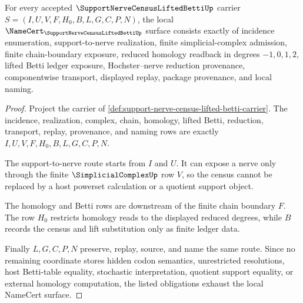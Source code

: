 \begin{theorem}
\label{thm:support-nerve-census-lifted-betti-obligations}
For every accepted $\SupportNerveCensusLiftedBettiUp$ carrier $S=(I,U,V,F,H_0,B,L,G,C,P,N)$, the local $\NameCert_{\SupportNerveCensusLiftedBettiUp}$ surface consists exactly of incidence enumeration, support-to-nerve realization, finite simplicial-complex admission, finite chain-boundary exposure, reduced homology readback in degrees $-1,0,1,2$, lifted Betti ledger exposure, Hochster--nerve reduction provenance, componentwise transport, displayed replay, package provenance, and local naming.
\end{theorem}
\begin{proof}
Project the carrier of \autoref{def:support-nerve-census-lifted-betti-carrier}. The incidence, realization, complex, chain, homology, lifted Betti, reduction, transport, replay, provenance, and naming rows are exactly $I,U,V,F,H_0,B,L,G,C,P,N$.

The support-to-nerve route starts from $I$ and $U$. It can expose a nerve only through the finite $\SimplicialComplexUp$ row $V$, so the census cannot be replaced by a host powerset calculation or a quotient support object.

The homology and Betti rows are downstream of the finite chain boundary $F$. The row $H_0$ restricts homology reads to the displayed reduced degrees, while $B$ records the census and lift substitution only as finite ledger data.

Finally $L,G,C,P,N$ preserve, replay, source, and name the same route. Since no remaining coordinate stores hidden codon semantics, unrestricted resolutions, host Betti-table equality, stochastic interpretation, quotient support equality, or external homology computation, the listed obligations exhaust the local NameCert surface.
\end{proof}

